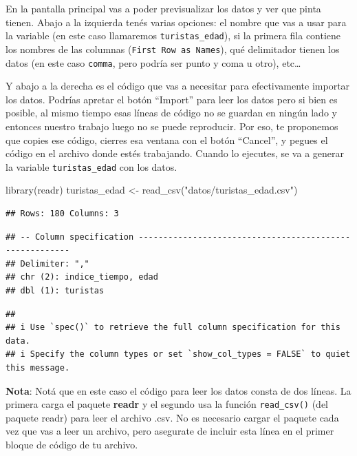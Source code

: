 \documentclass[
  openany]{book}
\newenvironment{Shaded}{\begin{snugshade}}{\end{snugshade}}
\newcommand{\FunctionTok}[1]{\textcolor[rgb]{0.00,0.00,0.00}{#1}}
\newcommand{\NormalTok}[1]{#1}
\newcommand{\OtherTok}[1]{\textcolor[rgb]{0.56,0.35,0.01}{#1}}
\newcommand{\StringTok}[1]{\textcolor[rgb]{0.31,0.60,0.02}{#1}}
\begin{document}
En la pantalla principal vas a poder previsualizar los datos y ver que pinta tienen.
Abajo a la izquierda tenés varias opciones: el nombre que vas a usar para la variable (en este caso llamaremos \texttt{turistas\_edad}), si la primera fila contiene los nombres de las columnas (\texttt{First\ Row\ as\ Names}), qué delimitador tienen los datos (en este caso \texttt{comma}, pero podría ser punto y coma u otro), etc\ldots{}

Y abajo a la derecha es el código que vas a necesitar para efectivamente importar los datos.
Podrías apretar el botón ``Import'' para leer los datos pero si bien es posible, al mismo tiempo esas líneas de código no se guardan en ningún lado y entonces nuestro trabajo luego no se puede reproducir.
Por eso, te proponemos que copies ese código, cierres esa ventana con el botón ``Cancel'', y pegues el código en el archivo donde estés trabajando.
Cuando lo ejecutes, se va a generar la variable \texttt{turistas\_edad} con los datos.

\begin{Shaded}
\begin{Highlighting}[]
\FunctionTok{library}\NormalTok{(readr)}
\NormalTok{turistas\_edad }\OtherTok{\textless{}{-}} \FunctionTok{read\_csv}\NormalTok{(}\StringTok{"datos/turistas\_edad.csv"}\NormalTok{)}
\end{Highlighting}
\end{Shaded}

\begin{verbatim}
## Rows: 180 Columns: 3
\end{verbatim}

\begin{verbatim}
## -- Column specification --------------------------------------------------------
## Delimiter: ","
## chr (2): indice_tiempo, edad
## dbl (1): turistas
\end{verbatim}

\begin{verbatim}
## 
## i Use `spec()` to retrieve the full column specification for this data.
## i Specify the column types or set `show_col_types = FALSE` to quiet this message.
\end{verbatim}

\textbf{Nota}: Notá que en este caso el código para leer los datos consta de dos líneas.
La primera carga el paquete \textbf{readr} y el segundo usa la función \texttt{read\_csv()} (del paquete readr) para leer el archivo .csv.
No es necesario cargar el paquete cada vez que vas a leer un archivo, pero asegurate de incluir esta línea en el primer bloque de código de tu archivo.
\end{document}
